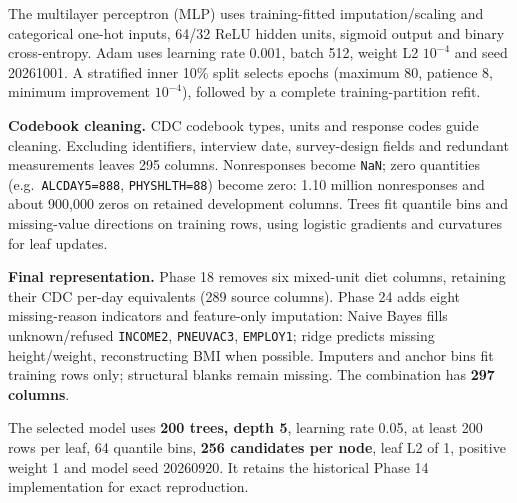 \documentclass[10pt,a4paper]{article}
\newcommand{\code}[1]{\texttt{\small #1}}
\begin{document}
The multilayer perceptron (MLP) uses training-fitted imputation/scaling and
categorical one-hot inputs, 64/32 ReLU hidden units, sigmoid output and binary
cross-entropy. Adam uses learning rate 0.001, batch 512, weight L2 $10^{-4}$
and seed 20261001. A stratified inner 10\% split selects epochs (maximum 80,
patience 8, minimum improvement $10^{-4}$), followed by a complete training-partition refit.

\textbf{Codebook cleaning.} CDC codebook types, units and response codes guide
cleaning. Excluding identifiers, interview date, survey-design fields and
redundant measurements leaves 295 columns. Nonresponses become \code{NaN};
zero quantities (e.g.\ \code{ALCDAY5=888}, \code{PHYSHLTH=88}) become zero:
1.10 million nonresponses and about 900,000 zeros on retained development
columns. Trees fit quantile bins and missing-value directions on training
rows, using logistic gradients and curvatures for leaf updates.

\textbf{Final representation.} Phase 18 removes six mixed-unit diet columns,
retaining their CDC per-day equivalents (289 source columns). Phase 24 adds
eight missing-reason indicators and feature-only imputation: Naive Bayes fills
unknown/refused \code{INCOME2}, \code{PNEUVAC3}, \code{EMPLOY1}; ridge predicts
missing height/weight, reconstructing BMI when possible. Imputers and anchor
bins fit training rows only; structural blanks remain missing. The combination
has \textbf{297 columns}.

The selected model uses \textbf{200 trees, depth 5}, learning rate 0.05,
at least 200 rows per leaf, 64 quantile bins, \textbf{256 candidates per node},
leaf L2 of 1, positive weight 1 and model seed 20260920. It retains the
historical Phase 14 implementation for exact reproduction.
\end{document}
